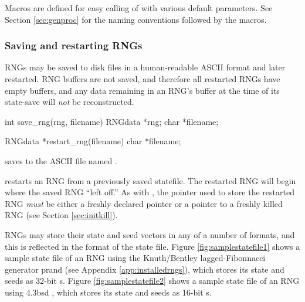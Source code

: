 Macros are defined for easy calling of  with various
default parameters.  See Section \ref{sec:genproc} for the naming
conventions followed by the macros.

\subsubsection{Saving and restarting RNGs}
\label{sec:saverestart}

RNGs may be saved to disk files in a human-readable ASCII format and
later restarted.  RNG buffers are not saved, and therefore all restarted
RNGs have empty buffers, and any data remaining in an RNG's buffer at
the time of its state-save will {\em not} be reconstructed.\\

\begin{example}
	int save_rng(rng, filename)
	RNGdata *rng;
	char *filename;

	RNGdata *restart_rng(filename)
	char *filename;\\
\end{example}

 saves  to the ASCII file named .

 restarts an RNG from a previously saved statefile.
The restarted RNG will begin where the saved RNG ``left off.''  As with
, the  pointer used to store the restarted
RNG {\em must} be either a freshly declared pointer or a pointer to a
freshly killed RNG (see Section \ref{sec:initkill}).

RNGs may store their state and seed vectors in any of a number of
formats, and this is reflected in the format of the state file.  Figure
\ref{fig:samplestatefile1} shows a sample state file of an RNG using
the Knuth/Bentley lagged-Fibonnacci generator prand (see Appendix
\ref{app:installedrngs}), which stores its state and seeds as 32-bit
s.  Figure \ref{fig:samplestatefile2} shows a sample
state file of an RNG using 4.3bsd , which stores its state
and seeds as 16-bit s.

